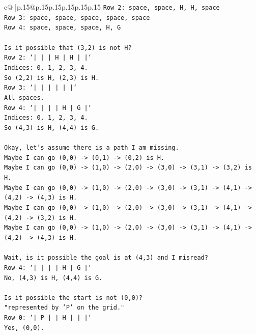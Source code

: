 \documentclass{article}
\begin{document}
{\begin{supertabular}{c@{$\;$}|p{.15\linewidth}@{}p{.15\linewidth}p{.15\linewidth}p{.15\linewidth}p{.15\linewidth}p{.15\linewidth}}
{{{\texttt{Row 2: space, space, H, H, space} \\
\texttt{Row 3: space, space, space, space, space} \\
\texttt{Row 4: space, space, space, H, G} \\
\\ 
\texttt{Is it possible that (3,2) is not H?} \\
\texttt{Row 2: `|     |     |  H  |  H  |     |`} \\
\texttt{Indices: 0, 1, 2, 3, 4.} \\
\texttt{So (2,2) is H, (2,3) is H.} \\
\texttt{Row 3: `|     |     |     |     |     |`} \\
\texttt{All spaces.} \\
\texttt{Row 4: `|     |     |     |  H  |  G  |`} \\
\texttt{Indices: 0, 1, 2, 3, 4.} \\
\texttt{So (4,3) is H, (4,4) is G.} \\
\\ 
\texttt{Okay, let's assume there is a path I am missing.} \\
\texttt{Maybe I can go (0,0) {-}> (0,1) {-}> (0,2) is H.} \\
\texttt{Maybe I can go (0,0) {-}> (1,0) {-}> (2,0) {-}> (3,0) {-}> (3,1) {-}> (3,2) is H.} \\
\texttt{Maybe I can go (0,0) {-}> (1,0) {-}> (2,0) {-}> (3,0) {-}> (3,1) {-}> (4,1) {-}> (4,2) {-}> (4,3) is H.} \\
\texttt{Maybe I can go (0,0) {-}> (1,0) {-}> (2,0) {-}> (3,0) {-}> (3,1) {-}> (4,1) {-}> (4,2) {-}> (3,2) is H.} \\
\texttt{Maybe I can go (0,0) {-}> (1,0) {-}> (2,0) {-}> (3,0) {-}> (3,1) {-}> (4,1) {-}> (4,2) {-}> (4,3) is H.} \\
\\ 
\texttt{Wait, is it possible the goal is at (4,3) and I misread?} \\
\texttt{Row 4: `|     |     |     |  H  |  G  |`} \\
\texttt{No, (4,3) is H, (4,4) is G.} \\
\\ 
\texttt{Is it possible the start is not (0,0)?} \\
\texttt{"represented by 'P' on the grid."} \\
\texttt{Row 0: `|  P  |     |  H  |     |     |`} \\
\texttt{Yes, (0,0).} \\
}}}
\end{supertabular}}
\end{document}
